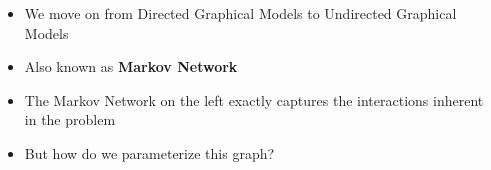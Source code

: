 \begin{frame}
	\begin{columns}
		\begin{overlayarea}{\textwidth}{\textheight}
		\vspace{0.1in}
		\begin{center}
		\end{center}
		\end{overlayarea}
		\begin{overlayarea}{\textwidth}{\textheight}
			\begin{itemize}\justifying
			\item<1-> We move on from Directed Graphical Models to Undirected Graphical Models
			\item<2-> Also known as \textbf{Markov Network}
			\item<3-> The Markov Network on the left exactly captures the interactions inherent in the problem 
			\item<4-> But how do we parameterize this graph?
			\end{itemize}
		\end{overlayarea}
	\end{columns}
\end{frame}
